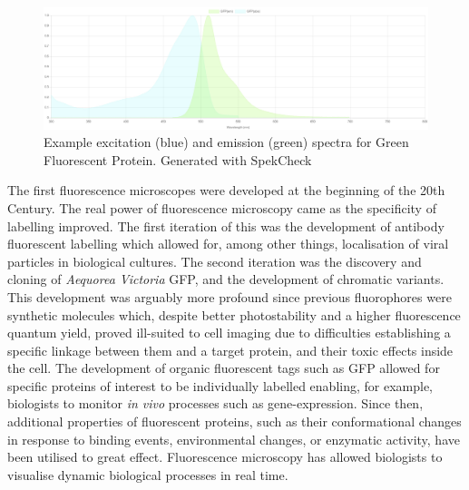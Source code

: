 \begin{figure}
	\centering
	\includegraphics[width=\textwidth]{images/GFP_emission_absorption_spectra.jpg}
	\caption[Example excitation and emission spectra]{Example excitation (blue) 
		and emission (green) spectra for Green Fluorescent Protein. Generated with SpekCheck\cite{phillips2018spekcheck}}
	\label{fig:GFP_emission_absorption_spectra}
\end{figure}

The first fluorescence microscopes were developed at the beginning of the 20th Century\cite{yuste2005fluorescence,renz2013fluorescence}. The real power of 
fluorescence microscopy came as the specificity of labelling improved.  The 
first iteration of this was the development of antibody fluorescent labelling 
which allowed for, among other things, localisation of viral particles in 
biological 
cultures\cite{coons1942demonstration,coons1951fluorescent,weller1954fluorescent}.
The second iteration was the discovery and cloning of \textit{Aequorea 
	Victoria} GFP, and the development of chromatic 
variants\cite{prasher1992primary,heim1996engineering}. This development was 
arguably more profound since previous fluorophores were synthetic molecules 
which, despite better photostability and a higher fluorescence quantum yield, 
proved ill-suited to cell imaging due to difficulties establishing a specific 
linkage between them and a target protein, and their toxic effects inside the 
cell.\cite{sahoo2012fluorescent} The development of organic fluorescent tags 
such as GFP allowed for specific proteins of interest to be individually 
labelled enabling, for example, biologists to monitor \textit{in vivo} 
processes such as gene-expression\cite{chalfie1994green}. Since then, 
additional properties of fluorescent proteins, such as their conformational 
changes in response to binding events, environmental changes, or enzymatic 
activity, have been utilised to great effect\cite{toseland2013fluorescent}. 
Fluorescence microscopy has allowed biologists to visualise dynamic biological
processes in real time.


